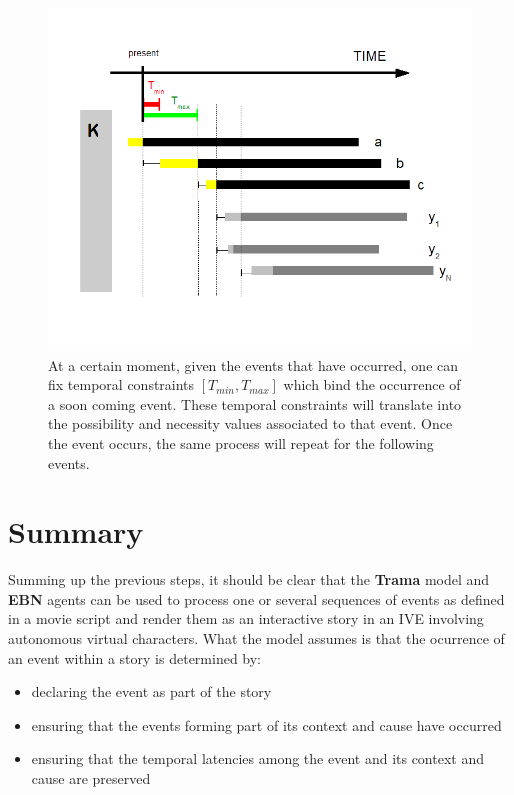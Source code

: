 \documentclass[
		twoside,openright,titlepage,numbers=noenddot,manychapters,
		headinclude,%
                footinclude=false,cleardoublepage=empty,
                BCOR=5mm,
		fontsize=11pt, %
                 enabledeprecatedfontcommands]{scrreprt}
\begin{document}
\begin{figure}[t]

\begin{center}
\includegraphics[width=12cm]{figures/timeline_present.png}
\caption{At a certain moment, given the events that have occurred, one can fix temporal constraints $[T_{min}, T_{max}]$ which bind the occurrence of a soon coming event. These temporal constraints will translate into the possibility and necessity values associated to that event. Once the event occurs, the same process will repeat for the following events.}
\label{fig_timeline_present}
\end{center}

\end{figure}


\section{Summary}
Summing up the previous steps, it should be clear that the \textbf{Trama} model and \textbf{EBN} agents can be used to process one or several sequences of events as defined in a movie script and render them as an interactive story in an IVE involving autonomous virtual characters. What the model assumes is that the ocurrence of an event within a story is determined by:
\begin{itemize}
\item declaring the event as part of the story
\item ensuring that the events forming part of its context and cause have occurred
\item ensuring that the temporal latencies among the event and its context and cause are preserved
\end{itemize}
\end{document}
